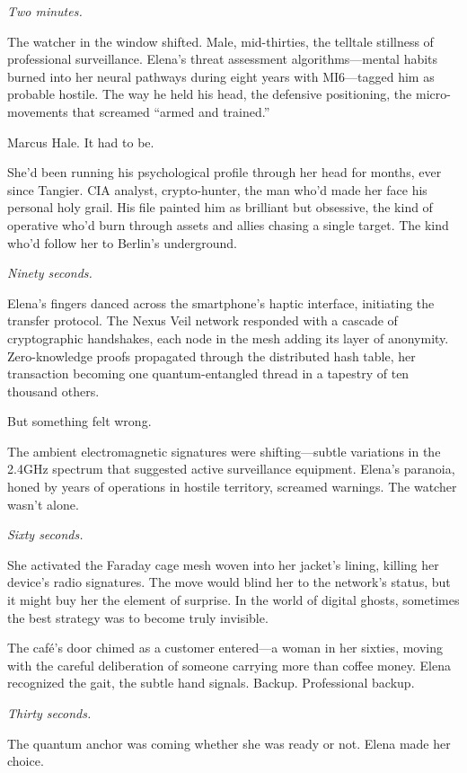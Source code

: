 \documentclass[12pt,letterpaper]{book}
\begin{document}
\emph{Two minutes.}

The watcher in the window shifted. Male, mid-thirties, the telltale stillness of professional surveillance. Elena's threat assessment algorithms---mental habits burned into her neural pathways during eight years with MI6---tagged him as probable hostile. The way he held his head, the defensive positioning, the micro-movements that screamed ``armed and trained.''

Marcus Hale. It had to be.

She'd been running his psychological profile through her head for months, ever since Tangier. CIA analyst, crypto-hunter, the man who'd made her face his personal holy grail. His file painted him as brilliant but obsessive, the kind of operative who'd burn through assets and allies chasing a single target. The kind who'd follow her to Berlin's underground.

\emph{Ninety seconds.}

Elena's fingers danced across the smartphone's haptic interface, initiating the transfer protocol. The Nexus Veil network responded with a cascade of cryptographic handshakes, each node in the mesh adding its layer of anonymity. Zero-knowledge proofs propagated through the distributed hash table, her transaction becoming one quantum-entangled thread in a tapestry of ten thousand others.

But something felt wrong.

The ambient electromagnetic signatures were shifting---subtle variations in the 2.4GHz spectrum that suggested active surveillance equipment. Elena's paranoia, honed by years of operations in hostile territory, screamed warnings. The watcher wasn't alone.

\emph{Sixty seconds.}

She activated the Faraday cage mesh woven into her jacket's lining, killing her device's radio signatures. The move would blind her to the network's status, but it might buy her the element of surprise. In the world of digital ghosts, sometimes the best strategy was to become truly invisible.

The café's door chimed as a customer entered---a woman in her sixties, moving with the careful deliberation of someone carrying more than coffee money. Elena recognized the gait, the subtle hand signals. Backup. Professional backup.

\emph{Thirty seconds.}

The quantum anchor was coming whether she was ready or not. Elena made her choice.
\end{document}
